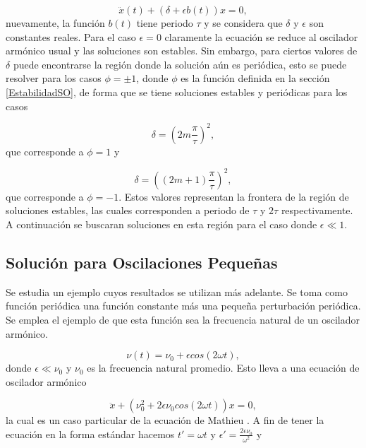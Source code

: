 \documentclass[10pt,a4paper]{report}
\begin{document}
\begin{equation}
\ddot{x}(t) + (\delta + \epsilon b(t))x = 0,
\end{equation} nuevamente, la función $b(t)$ tiene periodo $\tau$ y se considera que $\delta$ y $\epsilon$ son constantes reales. Para el caso $\epsilon = 0$ claramente la ecuación se reduce al oscilador armónico usual y las soluciones son estables. Sin embargo, para ciertos valores de $\delta$ puede encontrarse la región donde la solución aún es periódica, esto se puede resolver para los casos $\phi = \pm 1$, donde $\phi$ es la función definida en la sección \eqref{EstabilidadSO}, de forma que se tiene soluciones estables y periódicas para los casos

\begin{equation}
\delta = (2m\frac{\pi}{\tau})^2, 
\end{equation} que corresponde a $\phi=1$ y

\begin{equation}
\delta = ((2m+1)\frac{\pi}{\tau})^2,
\end{equation}
que corresponde a $\phi=-1$. Estos valores representan la frontera de
la región de soluciones estables, las cuales corresponden a periodo de
$\tau$ y $2\tau$ respectivamente. A continuación se buscaran soluciones
en esta región para el caso donde $\epsilon \ll 1$.

\subsection{Solución para Oscilaciones Pequeñas}\label{SmallOscilations}

Se estudia un ejemplo cuyos resultados se utilizan más adelante. Se toma como función periódica una función constante más una pequeña perturbación periódica. Se emplea el ejemplo de que esta función sea la frecuencia natural de un oscilador armónico.

\begin{equation}
\nu(t) = \nu_0 + \epsilon cos(2\omega t),
\end{equation} donde $\epsilon \ll \nu_0$ y $\nu_0$ es la frecuencia natural promedio. Esto lleva a una ecuación de oscilador armónico

\begin{equation}\label{SmallOscillationsTDHO}
\ddot{x} + (\nu_0^2 + 2\epsilon \nu_0 cos(2\omega t))x = 0,
\end{equation} la cual es un caso particular de la ecuación de Mathieu \cite{YerchuckMathieuEquation}. A fin de tener la ecuación en la forma estándar hacemos $t'= \omega t$ y $\epsilon' = \frac{2\epsilon \nu_0}{\omega^2}$ y
\end{document}
